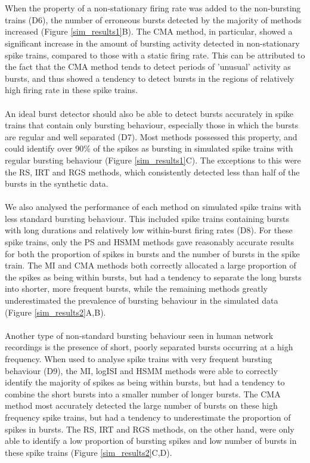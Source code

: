 \documentclass[12pt, titlepage]{article}
\begin{document}
	\\ \\ When the property of a non-stationary firing rate was added to the non-bursting trains (D6), the number of erroneous bursts detected by the majority of methods increased (Figure \ref{sim_results1}B). The CMA method, in particular, showed a significant increase in the amount of bursting activity detected in non-stationary spike trains, compared to those with a static firing rate. This can be attributed to the fact that the CMA method tends to detect periods of 'unusual' activity as bursts, and thus showed a tendency to detect bursts in the regions of relatively high firing rate in these spike trains.
	\\ \\ An ideal burst detector should also be able to detect bursts accurately in spike trains that contain only bursting behaviour, especially those in which the bursts are regular and well separated (D7). Most methods possessed this property, and could identify over 90\% of the spikes as bursting in simulated spike trains with regular bursting behaviour (Figure \ref{sim_results1}C). The exceptions to this were the RS, IRT and RGS methods, which consistently detected less than half of the bursts in the synthetic data.
	\\ \\ We also analysed the performance of each method on simulated spike trains with less standard bursting behaviour. This included  spike trains containing bursts with long durations and relatively low within-burst firing rates (D8). For these spike trains, only the PS and HSMM methods gave reasonably accurate results for both the proportion of spikes in bursts and the number of bursts in the spike train. The MI and CMA methods both correctly allocated a large proportion of the spikes as being within bursts, but had a tendency to separate the long bursts into shorter, more frequent bursts, while the remaining methods greatly underestimated the prevalence of bursting behaviour in the simulated data (Figure \ref{sim_results2}A,B).
	\\ \\ Another type of non-standard bursting behaviour seen in human network recordings is the presence of short, poorly separated bursts occurring at a high frequency. When used to analyse spike trains with very frequent bursting behaviour (D9), the MI, logISI and HSMM methods were able to correctly identify the majority of spikes as being within bursts, but had a tendency to combine the short bursts into a smaller number of longer bursts. The CMA method most accurately detected the large number of bursts on these high frequency spike trains, but had a tendency to underestimate the proportion of spikes in bursts. The RS, IRT and RGS methods, on the other hand, were only able to identify a low proportion of bursting spikes and low number of bursts in these spike trains (Figure \ref{sim_results2}C,D).
\end{document}
